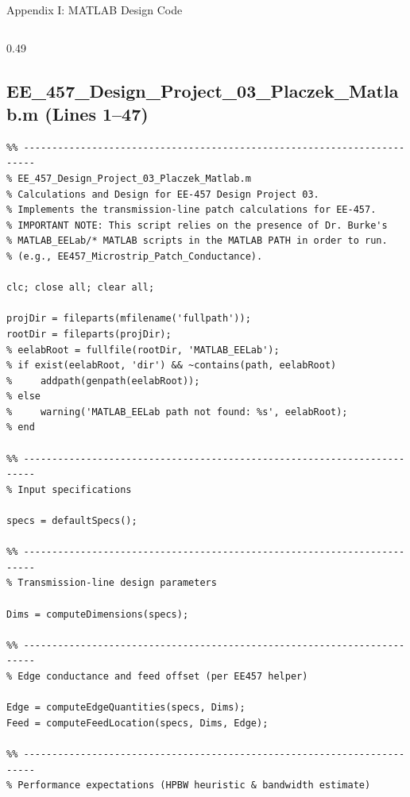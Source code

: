 \documentclass[compress,aspectratio=169,10pt]{beamer}
\begin{document}
\ActivateVerbatimLigatures


\begin{frame}[fragile]{Appendix I: MATLAB Design Code}
    \begin{columns}[T]
        \begin{column}{0.49\textwidth}
\subsection[Design code 1]{EE\_457\_Design\_Project\_03\_Placzek\_Matlab.m (Lines 1--47)}
            \begin{lstlisting}
%% ------------------------------------------------------------------------
% EE_457_Design_Project_03_Placzek_Matlab.m
% Calculations and Design for EE-457 Design Project 03.
% Implements the transmission-line patch calculations for EE-457.
% IMPORTANT NOTE: This script relies on the presence of Dr. Burke's
% MATLAB_EELab/* MATLAB scripts in the MATLAB PATH in order to run.
% (e.g., EE457_Microstrip_Patch_Conductance).

clc; close all; clear all;

projDir = fileparts(mfilename('fullpath'));
rootDir = fileparts(projDir);
% eelabRoot = fullfile(rootDir, 'MATLAB_EELab');
% if exist(eelabRoot, 'dir') && ~contains(path, eelabRoot)
%     addpath(genpath(eelabRoot));
% else
%     warning('MATLAB_EELab path not found: %s', eelabRoot);
% end

%% ------------------------------------------------------------------------
% Input specifications

specs = defaultSpecs();

%% ------------------------------------------------------------------------
% Transmission-line design parameters

Dims = computeDimensions(specs);

%% ------------------------------------------------------------------------
% Edge conductance and feed offset (per EE457 helper)

Edge = computeEdgeQuantities(specs, Dims);
Feed = computeFeedLocation(specs, Dims, Edge);

%% ------------------------------------------------------------------------
% Performance expectations (HPBW heuristic & bandwidth estimate)


\end{lstlisting}
\end{column}
\end{columns}
\end{frame}
\end{document}
